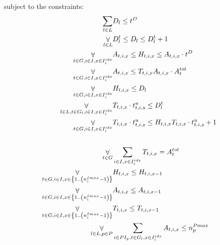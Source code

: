 {   subject to the constraints:
   \nopagebreak 
   \begin{align}
       \label{workflow:cLayerDeadline} \mathop\sum\limits_{l \in \LAYER} & \LayerDeadline_l \leq \workflowDeadline
       \\
       \label{workflow:cLayerTime}     \mathop\forall\limits_{l \in \LAYER} & \LayerTime_l \leq \LayerDeadline_l \leq \LayerTime_l + 1
       \\
       \label{workflow:cInstancesActiveHours} \mathop\forall\limits_{t \in \TASK, i \in \INSTANCE, x \in \instanceSet_i} & 
         \InstanceActive_{t,i,x} \leq \InstanceHours_{t,i,x} \leq  \InstanceActive_{t,i,x} \cdot \workflowDeadline
       \\
       \label{workflow:cInstancesActiveTasks} \mathop\forall\limits_{t \in \TASK, i \in \INSTANCE, x \in \instanceSet_i} &
         \InstanceActive_{t,i,x} \leq \InstanceTasks_{t,i,x} \InstanceActive_{t,i,x} \cdot \taskCount_t
       \\
       \label{workflow:cEnsureLayerDeadline} \mathop\forall\limits_{t \in \TASK, i \in \INSTANCE, x \in \instanceSet_i} &
         \InstanceHours_{t,i,x} \leq \LayerDeadline_l
       \\ 
       \label{workflow:cEnsureLayerTime} \mathop\forall\limits_{l \in \LAYER, t \in \TASK_l, i \in \INSTANCE, x \in \instanceSet_i} &
         \InstanceTasks_{t,i,x} \cdot \unitTime_{t,i,s} \leq \LayerTime_l
       \\       
       \label{workflow:cEnoughProcessingPower} \mathop\forall\limits_{t \in \TASK, i \in \INSTANCE, x \in \instanceSet_i} &
         \InstanceTasks_{t,i,x} \cdot \unitTime_{t,i,s} \leq \InstanceHours_{t,i,x} \InstanceTasks_{t,i,x} \cdot \unitTime_{t,i,s} + 1\\
       \\         
       \label{workflow:cProcessAllTasks} \mathop\forall\limits_{t \in \TASK} &
         \mathop\sum\limits_{i \in \INSTANCE, x \in \instanceSet_i} \InstanceTasks_{t,i,x} = \taskCount_t
       \\
       \label{workflow:cSymmetricSolutions1} \mathop\forall\limits_{t \in \TASK, i \in \INSTANCE, x \in \left\{1 .. \left(\instanceMaxMachines_i - 1\right)\right\}} & 
         \InstanceHours_{t,i,x} \leq \InstanceHours_{t,i,x-1} \\        
       \label{workflow:cSymmetricSolutions2} \mathop\forall\limits_{t \in \TASK, i \in \INSTANCE, x \in \left\{1 .. \left(\instanceMaxMachines_i - 1\right)\right\}} & 
         \InstanceActive_{t,i,x} \leq \InstanceActive_{t,i,x-1}\\ 
       \label{workflow:cSymmetricSolutions3} \mathop\forall\limits_{t \in \TASK, i \in \INSTANCE, x \in \left\{1 .. \left(\instanceMaxMachines_i - 1\right)\right\}} &
         \InstanceTasks_{t,i,x} \leq \InstanceTasks_{t,i,x-1}
       \\
       \label{workflow:cProviderLimits} \mathop\forall\limits_{l \in \LAYER, p \in \PROVIDER} &
         \mathop\sum\limits_{i \in \PROVIDERINSTANCES_p, t \in \TASK_l, x \in \instanceSet_i} \InstanceActive_{t,i,x} \leq \providerMaxMachines_p
    \end{align}
    
}
